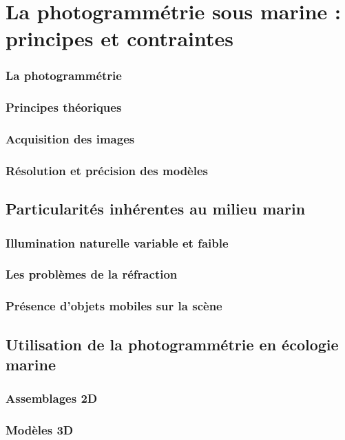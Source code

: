 \section{La photogrammétrie sous marine : principes et contraintes}
\subsubsection{La photogrammétrie}
\subsubsection{Principes théoriques}
\subsubsection{Acquisition des images}
\subsubsection{Résolution et précision des modèles}

\subsection{Particularités inhérentes au milieu marin}
\subsubsection{Illumination naturelle variable et faible}
\subsubsection{Les problèmes de la réfraction}
\subsubsection{Présence d'objets mobiles sur la scène}

\subsection{Utilisation de la photogrammétrie en écologie marine}
\subsubsection{Assemblages 2D}
\subsubsection{Modèles 3D}

